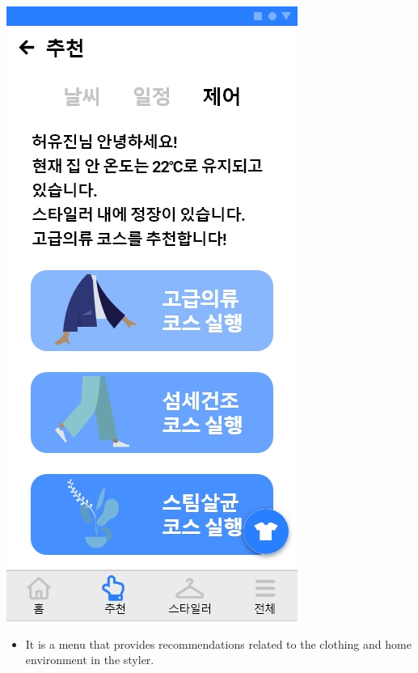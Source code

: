 \documentclass[conference]{IEEEtran}
\begin{document}
\begin{enumerate}
       \centerline{\includegraphics[scale=0.30]{9-3. 추천(제어).jpg}}
       \break
           \begin{itemize}
    \item[] It is a menu that provides recommendations related to the clothing and home environment in the styler.\\
\end{itemize}
\end{enumerate}
\end{document}
